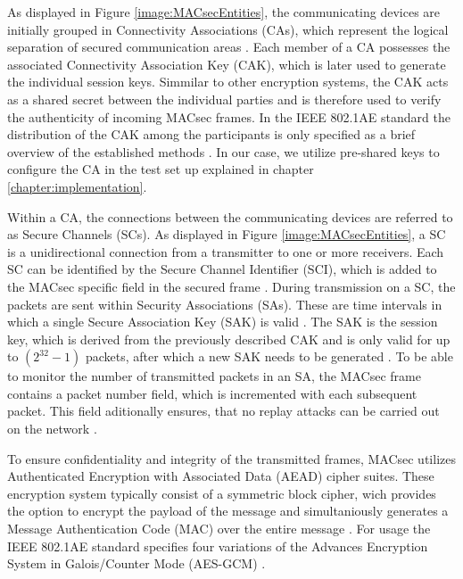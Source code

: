\documentclass[conference, onecolumn, a4paper]{IEEEtran}
\begin{document}
\noindent As displayed in Figure \ref{image:MACsecEntities}, the communicating devices are initially grouped in Connectivity Associations (CAs), which 
represent the logical separation of secured communication areas \cite[p. 35]{IEEE-802-1AE:2018}. Each member of a CA possesses the associated Connectivity 
Association Key (CAK), which is later used to generate the individual session keys. Simmilar to other encryption systems, the CAK acts as a shared 
secret between the individual parties and is therefore used to verify the authenticity of incoming MACsec frames. In the IEEE 802.1AE standard the 
distribution of the CAK among the participants is only specified as a brief overview of the established methods \cite[p. 230]{IEEE-802-1AE:2018}. 
In our case, we utilize pre-shared keys to configure the CA in the test set up explained in chapter \ref{chapter:implementation}.

\smallskip
Within a CA, the connections between the communicating devices are referred to as Secure Channels (SCs). As displayed in Figure \ref{image:MACsecEntities}, 
a SC is a unidirectional connection from a transmitter to one or more receivers. Each SC can be identified by the Secure Channel Identifier (SCI), 
which is added to the MACsec specific field in the secured frame \cite[p. 43]{IEEE-802-1AE:2018}. During transmission on a SC, the packets are sent 
within Security Associations (SAs). These are time intervals in which a single Secure Association Key (SAK) is valid \cite[p. 44]{IEEE-802-1AE:2018}. 
The SAK is the session key, which is derived from the previously described CAK and is only valid for up to ${(2^{32} -1)}$ packets, after which a new 
SAK needs to be generated \cite[p. 66]{IEEE-802-1AE:2018}. To be able to monitor the number of transmitted packets in an SA, the MACsec frame contains 
a packet number field, which is incremented with each subsequent packet. This field aditionally ensures, that no replay attacks can be carried out on 
the network \cite[p. 145]{IEEE-802-1AE:2018}. 

\smallskip
To ensure confidentiality and integrity of the transmitted frames, MACsec utilizes Authenticated Encryption with Associated Data (AEAD) cipher suites. 
These encryption system typically consist of a symmetric block cipher, wich provides the option to encrypt the payload of the message and simultaniously 
generates a Message Authentication Code (MAC) over the entire message \cite{GOOSE_confidentiality_integrity:2020}. For usage the IEEE 802.1AE standard 
specifies four variations of the Advances Encryption System in Galois/Counter Mode (AES-GCM) \cite[p. 143ff]{IEEE-802-1AE:2018}.
\end{document}
